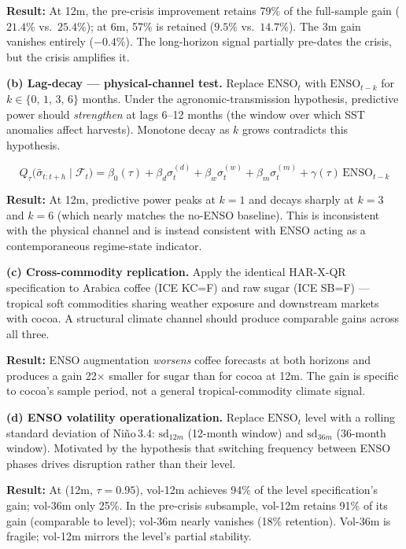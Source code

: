 \documentclass[10pt,a4paper]{article}
\begin{document}
\textbf{Result:} At 12m, the pre-crisis improvement retains 79\% of the
full-sample gain ($21.4\%$ vs.\ $25.4\%$); at 6m, 57\% is retained ($9.5\%$
vs.\ $14.7\%$). The 3m gain vanishes entirely ($-0.4\%$). The long-horizon
signal partially pre-dates the crisis, but the crisis amplifies it.

\medskip
\textbf{(b) Lag-decay --- physical-channel test.}
Replace $\text{ENSO}_t$ with $\text{ENSO}_{t-k}$ for $k \in \{0,\,1,\,3,\,6\}$
months. Under the agronomic-transmission hypothesis, predictive power should
\emph{strengthen} at lags 6--12 months (the window over which SST anomalies
affect harvests). Monotone decay as $k$ grows contradicts this hypothesis.

\begin{equation*}
\boxed{\;
Q_{\tau}\!\bigl(\bar{\sigma}_{t:t+h}\mid\mathcal{F}_t\bigr)
= \beta_0(\tau) + \beta_d \sigma_t^{(d)} + \beta_w \sigma_t^{(w)} + \beta_m \sigma_t^{(m)} + \gamma(\tau)\,\text{ENSO}_{t-k}
\;}
\end{equation*}

\textbf{Result:} At 12m, predictive power peaks at $k=1$ and decays sharply
at $k=3$ and $k=6$ (which nearly matches the no-ENSO baseline). This is
inconsistent with the physical channel and is instead consistent with ENSO
acting as a contemporaneous regime-state indicator.

\medskip
\textbf{(c) Cross-commodity replication.}
Apply the identical HAR-X-QR specification to Arabica coffee (ICE KC=F)
and raw sugar (ICE SB=F) --- tropical soft commodities sharing weather exposure
and downstream markets with cocoa. A structural climate channel should produce
comparable gains across all three.

\textbf{Result:} ENSO augmentation \emph{worsens} coffee forecasts at both
horizons and produces a gain 22$\times$ smaller for sugar than for cocoa at 12m.
The gain is specific to cocoa's sample period, not a general tropical-commodity
climate signal.

\medskip
\textbf{(d) ENSO volatility operationalization.}
Replace $\text{ENSO}_t$ level with a rolling standard deviation of Ni\~no\,3.4:
$\text{sd}_{12m}$ (12-month window) and $\text{sd}_{36m}$ (36-month window).
Motivated by the hypothesis that switching frequency between ENSO phases
drives disruption rather than their level.

\textbf{Result:} At (12m, $\tau=0.95$), vol-12m achieves 94\% of the level
specification's gain; vol-36m only 25\%. In the pre-crisis subsample, vol-12m
retains 91\% of its gain (comparable to level); vol-36m nearly vanishes (18\%
retention). Vol-36m is fragile; vol-12m mirrors the level's partial stability.
\end{document}

